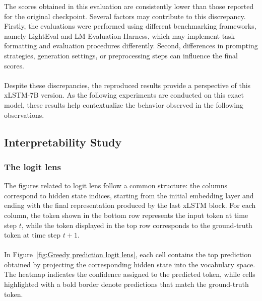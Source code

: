 \begin{table}[H]
\centering
{}
\caption{Benchmark results: reported vs reproduced}
\label{tab:benchmark_results_hf-vs-local}
\end{table}
%
\noindent The scores obtained in this evaluation are consistently lower than those reported for the original checkpoint. 
Several factors may contribute to this discrepancy. Firstly, the evaluations were performed 
using different benchmarking frameworks, namely LightEval and LM Evaluation Harness, which may 
implement task formatting and evaluation procedures differently. Second, differences in prompting 
strategies, generation settings, or preprocessing steps can influence the final scores. \\ \\
%
Despite these discrepancies, the reproduced results provide a perspective of this xLSTM-7B version. As the following experiments are conducted on this exact model, these results
help contextualize the behavior observed in the following observations.
\subsection{Interpretability Study}
\subsubsection{The logit lens}

The figures related to logit lens follow a common structure: the columns correspond to hidden state 
indices, starting from the initial embedding layer and ending with the final representation produced by the 
last xLSTM block. For each column, the token shown in the bottom row represents the input token at time step
$t$, while the token displayed in the top row corresponds to the ground-truth token at time step $t+1$. \\ \\ 
%
In Figure~\ref{fig:Greedy prediction logit lens}, each cell contains the top prediction obtained by projecting the corresponding hidden state into the vocabulary space. The heatmap indicates the confidence assigned to the predicted token, while cells highlighted with a bold border denote predictions that match the ground-truth token.\\ \\

